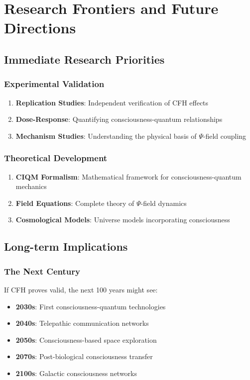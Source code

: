 \documentclass[12pt,article]{memoir}
\begin{document}
\chapter{Research Frontiers and Future Directions}

\section{Immediate Research Priorities}

\subsection{Experimental Validation}

\begin{enumerate}
    \item \textbf{Replication Studies}: Independent verification of CFH effects
    \item \textbf{Dose-Response}: Quantifying consciousness-quantum relationships
    \item \textbf{Mechanism Studies}: Understanding the physical basis of $\Psi$-field coupling
\end{enumerate}

\subsection{Theoretical Development}

\begin{enumerate}
    \item \textbf{CIQM Formalism}: Mathematical framework for consciousness-quantum mechanics
    \item \textbf{Field Equations}: Complete theory of $\Psi$-field dynamics
    \item \textbf{Cosmological Models}: Universe models incorporating consciousness
\end{enumerate}

\section{Long-term Implications}

\subsection{The Next Century}

If CFH proves valid, the next 100 years might see:

\begin{itemize}
    \item \textbf{2030s}: First consciousness-quantum technologies
    \item \textbf{2040s}: Telepathic communication networks
    \item \textbf{2050s}: Consciousness-based space exploration
    \item \textbf{2070s}: Post-biological consciousness transfer
    \item \textbf{2100s}: Galactic consciousness networks
\end{itemize}
\end{document}

